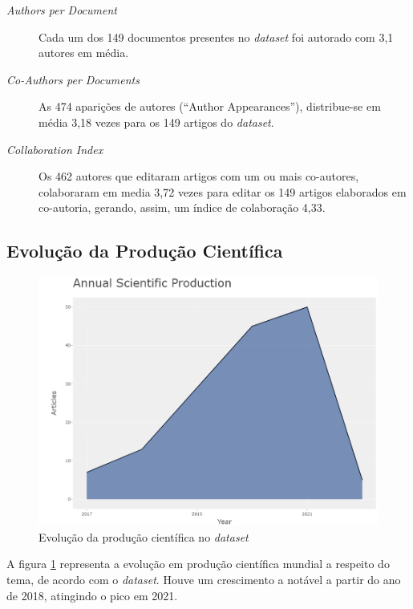 \begin{description}
    \item [\textit{Authors per Document}] Cada um dos 149 documentos presentes no \textit{dataset} foi autorado com 3,1 autores em média.
    \item [\textit{Co-Authors per Documents}] As 474 aparições de autores (``Author Appearances''), distribue-se em média 3,18 vezes para os 149 artigos do \textit{dataset}.
    \item [\textit{Collaboration Index}] Os 462 autores que editaram artigos com um ou mais co-autores, colaboraram em media 3,72 vezes para editar os 149 artigos elaborados em co-autoria, gerando, assim, um índice de colaboração 4,33. 
\end{description}

\subsection{Evolução da Produção Científica}

\begin{figure}
    \centering
    \includegraphics[width=1\textwidth]{experiments/FernandoCordeiro/AnaliseBibliometrica/Blockchain/annual_plot.png}
    \caption{Evolução da produção científica no \textit{dataset}}
    \label{fig:evol:anual:BLOCKCHAIN@FernandoCordeiro}
\end{figure}

A figura \ref{fig:evol:anual:BLOCKCHAIN@FernandoCordeiro} representa a evolução em produção científica mundial a respeito do tema, de acordo com o \textit{dataset}. Houve um crescimento a notável a partir do ano de 2018, atingindo o pico em 2021. 

